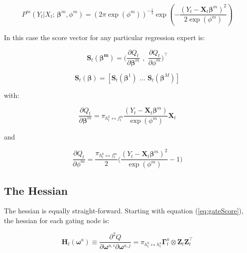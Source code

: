 \documentclass[12pt]{article}
\newcommand{\bw}[1]{\boldsymbol{\omega}^{#1}}
\newcommand{\Ht}[1]{\mathbf{H}_{t}(#1)}
\newcommand{\gateprod}[2]{\pi_{#1 \longleftrightarrow #2}}
\begin{document}
\begin{equation}
  P^{m}(Y_{t} | X_{t}; \, \boldsymbol{\beta}^{m}, \phi^{m}) = \left( 2 \pi \exp ( \phi^{m} ) \right)^{-\frac{1}{2}} \exp{ \left( -\frac{  ( Y_{t} - \boldsymbol{X}_{t} \boldsymbol{\beta}^{m} )^{2}  }{2 \exp (\phi^{m}) } \right) }
\end{equation}


In this case the score vector for any particular
regression expert is:

\begin{equation} \label{eq:expertScore}
  \boldsymbol{S}_{t}(\boldsymbol{\beta^{m}}) = \Big( \frac{\partial Q_{t}}{\partial \boldsymbol{\beta}^{m}} \,\,,\,\, \frac{\partial Q_{t}}{\partial \phi^{m}} \Big)^{\top}
\end{equation}

\begin{equation}
  \boldsymbol{S}_{t}(\boldsymbol{\beta}) = [ \boldsymbol{S}_{t}(\boldsymbol{\beta}^{1}) \,\, \ldots \,\, \boldsymbol{S}_{t}(\boldsymbol{\beta}^{M}) ]
\end{equation}



with:

\begin{equation}
  \frac{\partial Q_{t}}{\partial \boldsymbol{\beta}^{m}} = \gateprod{h^{0}_{t}}{f^{m}_{t}} \frac{( Y_{t} - \boldsymbol{X}_{t} \boldsymbol{\beta}^{m} )}{\exp{(\phi^{m})}} \boldsymbol{X}_{t}
\end{equation}
 
and

\begin{equation}
  \frac{\partial Q_{t}}{\partial \phi^{m}} = \frac{\gateprod{h^{0}_{t}}{f^{m}_{t}}}{2} \Big( \frac{( Y_{t} - \boldsymbol{X}_{t} \boldsymbol{\beta}^{m} )^{2}}{\exp{(\phi^{m})}} - 1 \Big)
\end{equation}




\subsection{The Hessian}

The hessian is equally straight-forward. Starting with equation
(\ref{eq:gateScore}), the hessian for each gating node is:


\begin{equation} \label{eq:nodehessian}
  \Ht{\bw{a}} \equiv \frac{\partial^{2} Q}{\partial \boldsymbol{\omega}^{a,i} \partial \boldsymbol{\omega}^{a,j}} = \gateprod{h^{0}_{t}}{h^{a}_{t}} \boldsymbol{\Gamma}^{a}_{t} \otimes  \boldsymbol{Z}_{t} \boldsymbol{Z}_{t}^\top
\end{equation}
\end{document}
